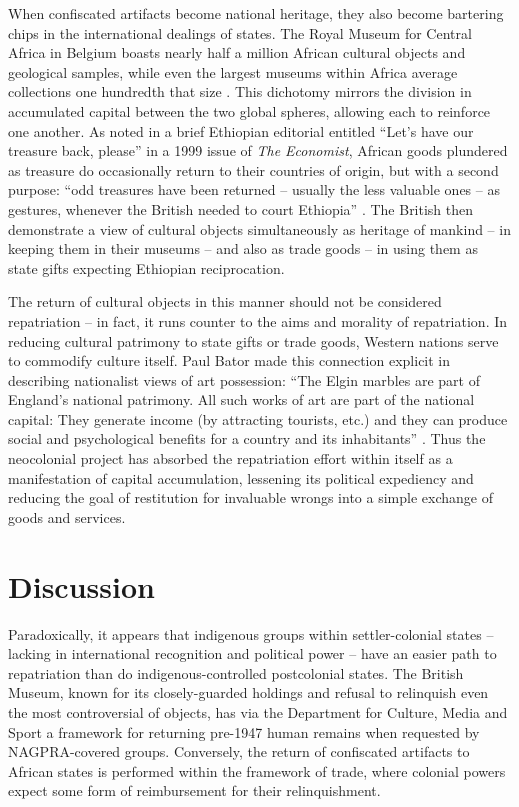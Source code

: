 \documentclass[american]{../../../coursework}
\begin{document}
When confiscated artifacts become national heritage, they also become
bartering chips in the international dealings of states. The Royal Museum for
Central Africa in Belgium boasts nearly half a million African cultural
objects and geological samples, while even the largest museums within Africa
average collections one hundredth that size \parencite{Shy09}. This dichotomy
mirrors the division in accumulated capital between the two global spheres,
allowing each to reinforce one another. As noted in a brief Ethiopian
editorial entitled ``Let's have our treasure back, please'' in a 1999 issue of
\textit{The Economist}, African goods plundered as treasure do occasionally
return to their countries of origin, but with a second purpose: ``odd
treasures have been returned -- usually the less valuable ones -- as gestures,
whenever the British needed to court Ethiopia'' \parencite[66]{The99}. The
British then demonstrate a view of cultural objects simultaneously as heritage
of mankind -- in keeping them in their museums -- and also as trade goods --
in using them as state gifts expecting Ethiopian reciprocation.

The return of cultural objects in this manner should not be considered
repatriation -- in fact, it runs counter to the aims and morality of
repatriation. In reducing cultural patrimony to state gifts or trade goods,
Western nations serve to commodify culture itself. Paul Bator made this
connection explicit in describing nationalist views of art possession: ``The
Elgin marbles are part of England's national patrimony. All such works of art
are part of the national capital: They generate income (by attracting
tourists, etc.) and they can produce social and psychological benefits for a
country and its inhabitants'' \parencite[303]{Bat82}. Thus the neocolonial
project has absorbed the repatriation effort within itself as a manifestation
of capital accumulation, lessening its political expediency and reducing the
goal of restitution for invaluable wrongs into a simple exchange of goods and
services.

\section{Discussion}

Paradoxically, it appears that indigenous groups within settler-colonial
states -- lacking in international recognition and political power -- have an
easier path to repatriation than do indigenous-controlled postcolonial states.
The British Museum, known for its closely-guarded holdings and refusal to
relinquish even the most controversial of objects, has via the Department for
Culture, Media and Sport a framework for returning pre-1947 human remains when
requested by NAGPRA-covered groups. Conversely, the return of confiscated
artifacts to African states is performed within the framework of trade, where
colonial powers expect some form of reimbursement for their relinquishment.
\end{document}
